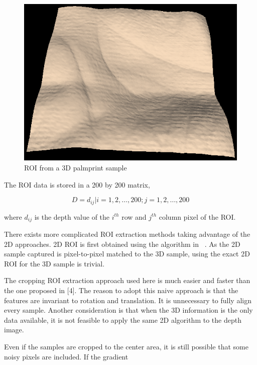 \begin{figure}[htb]
\begin{center}
\includegraphics[width=0.9\linewidth]{ch-methodology/figures/sample-roi}
\caption[ROI from a 3D palmprint sample]{ROI from a 3D palmprint sample}
\label{fig:methodology:sample-roi}
\end{center}
\end{figure}

The ROI data is stored in a 200 by 200 matrix,

\begin{equation}
\label{eq:methodology:roimatrix}
D=d_{ij}|i=1,2,\dots,200; j=1,2,\dots,200
\end{equation}

where $d_{ij}$ is the depth value of the $i^{th}$ row and $j^{th}$ column pixel of the ROI.

There exists more complicated ROI extraction methods taking advantage of the 2D approaches. 2D ROI is first obtained using the algorithm in ~\cite{Zhang:2003uf}. As the 2D sample captured is pixel-to-pixel matched to the 3D sample, using the exact 2D ROI for the 3D sample is trivial.

The cropping ROI extraction approach used here is much easier and faster than the one proposed in [4]. The reason to adopt this naive approach is that the features are invariant to rotation and translation. It is unnecessary to fully align every sample. Another consideration is that when the 3D information is the only data available, it is not feasible to apply the same 2D algorithm to the depth image.

Even if the samples are cropped to the center area, it is still possible that some noisy pixels are included. If the gradient

